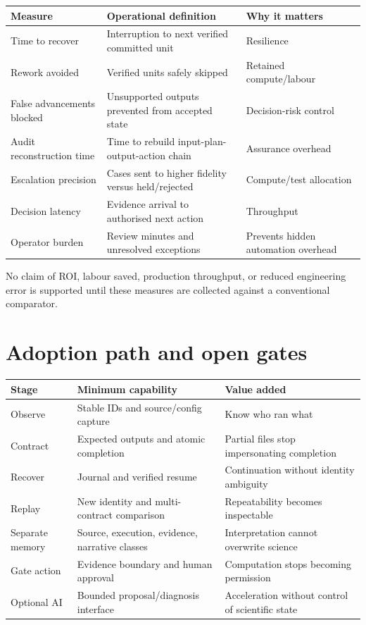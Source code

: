 \documentclass[9pt,a4paper]{article}
\begin{document}
\begin{tabularx}{\textwidth}{p{}YY}
\toprule Measure & Operational definition & Why it matters\\\midrule
Time to recover & Interruption to next verified committed unit & Resilience\\
Rework avoided & Verified units safely skipped & Retained compute/labour\\
False advancements blocked & Unsupported outputs prevented from accepted state & Decision-risk control\\
Audit reconstruction time & Time to rebuild input-plan-output-action chain & Assurance overhead\\
Escalation precision & Cases sent to higher fidelity versus held/rejected & Compute/test allocation\\
Decision latency & Evidence arrival to authorised next action & Throughput\\
Operator burden & Review minutes and unresolved exceptions & Prevents hidden automation overhead\\
\bottomrule
\end{tabularx}

No claim of ROI, labour saved, production throughput, or reduced engineering error is supported until these measures are collected against a conventional comparator.

\section{Adoption path and open gates}
\begin{tabularx}{\textwidth}{p{}YY}
\toprule Stage & Minimum capability & Value added\\\midrule
Observe & Stable IDs and source/config capture & Know who ran what\\
Contract & Expected outputs and atomic completion & Partial files stop impersonating completion\\
Recover & Journal and verified resume & Continuation without identity ambiguity\\
Replay & New identity and multi-contract comparison & Repeatability becomes inspectable\\
Separate memory & Source, execution, evidence, narrative classes & Interpretation cannot overwrite science\\
Gate action & Evidence boundary and human approval & Computation stops becoming permission\\
Optional AI & Bounded proposal/diagnosis interface & Acceleration without control of scientific state\\
\bottomrule
\end{tabularx}
\end{document}
